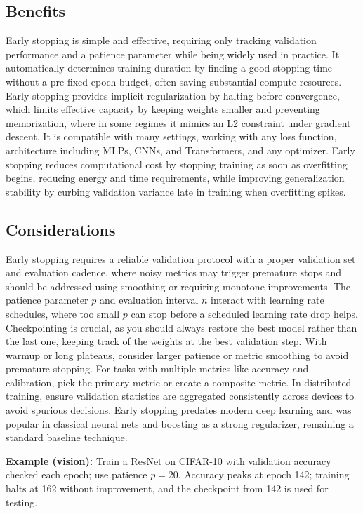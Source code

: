 \subsection{Benefits}

Early stopping is simple and effective, requiring only tracking validation performance and a patience parameter while being widely used in practice. It automatically determines training duration by finding a good stopping time without a pre-fixed epoch budget, often saving substantial compute resources. Early stopping provides implicit regularization by halting before convergence, which limits effective capacity by keeping weights smaller and preventing memorization, where in some regimes it mimics an L2 constraint under gradient descent. It is compatible with many settings, working with any loss function, architecture including MLPs, CNNs, and Transformers, and any optimizer. Early stopping reduces computational cost by stopping training as soon as overfitting begins, reducing energy and time requirements, while improving generalization stability by curbing validation variance late in training when overfitting spikes.

\subsection{Considerations}

Early stopping requires a reliable validation protocol with a proper validation set and evaluation cadence, where noisy metrics may trigger premature stops and should be addressed using smoothing or requiring monotone improvements. The patience parameter $p$ and evaluation interval $n$ interact with learning rate schedules, where too small $p$ can stop before a scheduled learning rate drop helps. Checkpointing is crucial, as you should always restore the best model rather than the last one, keeping track of the weights at the best validation step. With warmup or long plateaus, consider larger patience or metric smoothing to avoid premature stopping. For tasks with multiple metrics like accuracy and calibration, pick the primary metric or create a composite metric. In distributed training, ensure validation statistics are aggregated consistently across devices to avoid spurious decisions. Early stopping predates modern deep learning and was popular in classical neural nets and boosting as a strong regularizer, remaining a standard baseline technique.

\begin{example}
\textbf{Example (vision):} Train a ResNet on CIFAR-10 with validation accuracy checked each epoch; use patience $p=20$. Accuracy peaks at epoch 142; training halts at 162 without improvement, and the checkpoint from 142 is used for testing.
\end{example}

